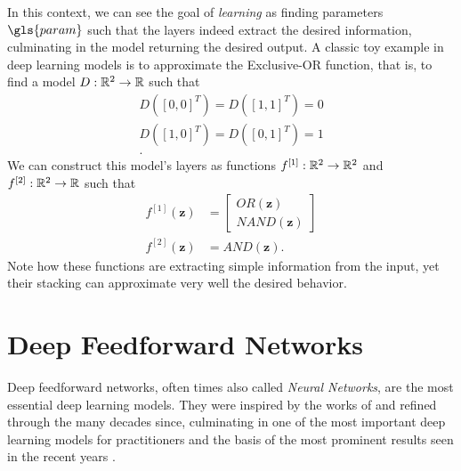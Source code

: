 In this context, we can see the goal of \textit{learning} as finding parameters $\gls{param}$ such that the layers indeed extract the desired information, culminating in the model returning the desired output.
A classic toy example in deep learning models is to approximate the Exclusive-OR function, that is, to find a model $D : \mathbb{R}^2 \to \mathbb{R}$ such that
\begin{align*}
    D([0,0]^T) = D([1,1]^T) = 0 \\
    D([1,0]^T) = D([0,1]^T) = 1 \\
.\end{align*}
We can construct this model's layers as functions $f^{[1]}:\mathbb{R}^2\to\mathbb{R}^2$ and $f^{[2]}:\mathbb{R}^2\to\mathbb{R}$ such that
\begin{align*}
    f^{[1]}(\bm{z}) &= \begin{bmatrix}
    OR(\bm{z}) \\
    NAND(\bm{z})
    \end{bmatrix} \\
    f^{[2]}(\bm{z}) &= AND(\bm{z})
.\end{align*}
Note how these functions are extracting simple information from the input, yet their stacking can approximate very well the desired behavior.

\section{Deep Feedforward Networks}\label{sec:neural-nets}

Deep feedforward networks, often times also called \emph{Neural Networks}\footnotemark, are the most essential deep learning models.
They were inspired by the works of \textcite{rosenblatt_perceptron_1957} and refined through the many decades since, culminating in one of the most important deep learning models for practitioners and the basis of the most prominent results seen in the recent years \cite{goodfellow_deep_2016}.

